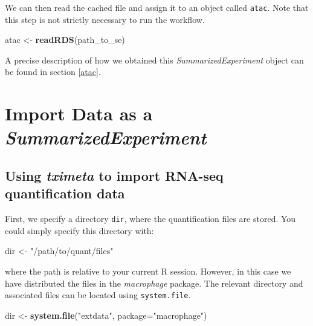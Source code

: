 \documentclass[
]{article}
\newenvironment{Shaded}{}{}
\newcommand{\DataTypeTok}[1]{\textcolor[rgb]{0.56,0.13,0.00}{#1}}
\newcommand{\KeywordTok}[1]{\textcolor[rgb]{0.00,0.44,0.13}{\textbf{#1}}}
\newcommand{\NormalTok}[1]{#1}
\newcommand{\StringTok}[1]{\textcolor[rgb]{0.25,0.44,0.63}{#1}}
\begin{document}
We can then read the cached file and assign it to an object called \texttt{atac}. Note
that this step is not strictly necessary to run the workflow.

\begin{Shaded}
\begin{Highlighting}[]
\NormalTok{atac <-}\StringTok{ }\KeywordTok{readRDS}\NormalTok{(path_to_se)}
\end{Highlighting}
\end{Shaded}

A precise description of how we obtained this \emph{SummarizedExperiment} object can
be found in section \ref{atac}.

\hypertarget{se}{%
\section{\texorpdfstring{Import Data as a \emph{SummarizedExperiment}}{Import Data as a SummarizedExperiment}}\label{se}}

\hypertarget{using-tximeta-to-import-rna-seq-quantification-data}{%
\subsection{\texorpdfstring{Using \emph{tximeta} to import RNA-seq quantification data}{Using tximeta to import RNA-seq quantification data}}\label{using-tximeta-to-import-rna-seq-quantification-data}}

First, we specify a directory \texttt{dir}, where the quantification files are stored.
You could simply specify this directory with:

\begin{Shaded}
\begin{Highlighting}[]
\NormalTok{dir <-}\StringTok{ "/path/to/quant/files"}
\end{Highlighting}
\end{Shaded}

where the path is relative to your current R session. However, in this case we
have distributed the files in the \emph{macrophage} package. The relevant directory
and associated files can be located using \texttt{system.file}.

\begin{Shaded}
\begin{Highlighting}[]
\NormalTok{dir <-}\StringTok{ }\KeywordTok{system.file}\NormalTok{(}\StringTok{"extdata"}\NormalTok{, }\DataTypeTok{package=}\StringTok{"macrophage"}\NormalTok{)}
\end{Highlighting}
\end{Shaded}
\end{document}
